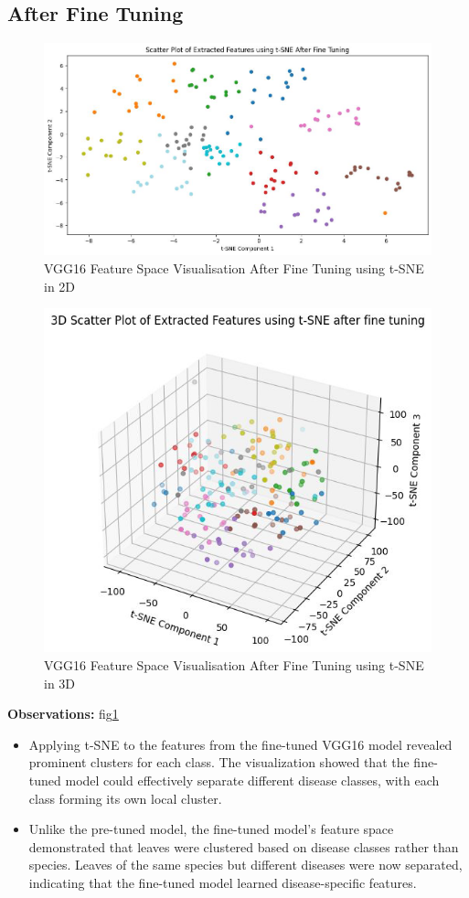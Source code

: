 \subsection{After Fine Tuning}
\begin{figure}
    \centering
    \includegraphics[width=1\linewidth]{graphics//chapter7/vgg feature viz after fine tuning 2d.png}
    \caption{VGG16 Feature Space Visualisation After Fine Tuning using t-SNE in 2D}
    \label{fig:tsne-aft-2d}
\end{figure}

\begin{figure}
    \centering
    \includegraphics[width=0.75\linewidth]{graphics//chapter7/vgg feature viz after fine tuning tsne.png}
    \caption{VGG16 Feature Space Visualisation After Fine Tuning using t-SNE in 3D}
    \label{fig:tsne-aft-3d}
\end{figure}
\textbf{Observations: } fig\ref{fig:tsne-aft-2d}
\begin{itemize}
    \item Applying t-SNE to the features from the fine-tuned VGG16 model revealed prominent clusters for each class. The visualization showed that the fine-tuned model could effectively separate different disease classes, with each class forming its own local cluster.
    \item Unlike the pre-tuned model, the fine-tuned model’s feature space demonstrated that leaves were clustered based on disease classes rather than species. Leaves of the same species but different diseases were now separated, indicating that the fine-tuned model learned disease-specific features.
\end{itemize}


